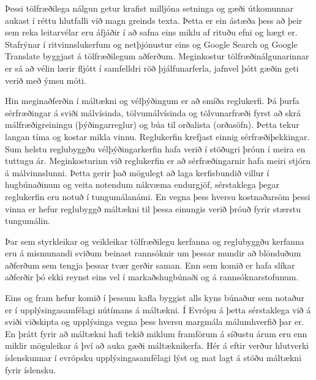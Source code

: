 \begin{multicols}{2}
Þessi tölfræðilega nálgun getur krafist milljóna setninga og gæði útkomunnar aukast í réttu hlutfalli við magn greinds texta. Þetta er ein ástæða þess að þeir sem reka leitarvélar eru áfjáðir í að safna eins miklu af rituðu efni og hægt er. Stafrýnar í ritvinnslukerfum og netþjónustur eins og Google Search og Google Translate byggjast á tölfræðilegum aðferðum. Meginkostur tölfræðinálgunarinnar er sá að vélin lærir fljótt í samfelldri röð þjálfunarferla, jafnvel þótt gæðin geti verið með ýmsu móti.

Hin meginaðferðin í máltækni og vélþýðingum er að smíða reglukerfi. Þá þurfa sérfræðingar á sviði málvísinda, tölvumálvísinda og tölvunarfræði fyrst að skrá málfræðigreiningu (þýðingarreglur) og búa til orðalista (orðasöfn). Þetta tekur langan tíma og kostar mikla vinnu. Reglukerfin krefjast einnig sérfræðiþekkingar. Sum helstu reglubyggðu vélþýðingarkerfin hafa verið í stöðugri þróun í meira en tuttugu ár. Meginkosturinn við reglukerfin er að sérfræðingarnir hafa meiri stjórn á málvinnslunni. Þetta gerir það mögulegt að laga kerfisbundið villur í hugbúnaðinum og veita notendum nákvæma endurgjöf, sérstaklega þegar reglukerfin eru notuð í tungumálanámi. En vegna þess hversu kostnaðarsöm þessi vinna er hefur reglubyggð máltækni til þessa einungis verið þróuð fyrir stærstu tungumálin.

Þar sem styrkleikar og veikleikar tölfræðilegu kerfanna og reglubyggðu kerfanna eru á mismunandi sviðum beinast rannsóknir um þessar mundir að blönduðum aðferðum sem tengja þessar tvær gerðir saman. Enn sem komið er hafa slíkar aðferðir þó ekki reynst eins vel í markaðshugbúnaði og á rannsóknarstofunum.

Eins og fram hefur komið í þessum kafla byggist alls kyns búnaður sem notaður er í upplýsingasamfélagi nútímans á máltækni. Í Evrópu á þetta sérstaklega við á sviði viðskipta og upplýsinga vegna þess hversu margmála málumhverfið þar er. En þrátt fyrir að máltækni hafi tekið miklum framförum á síðustu árum eru enn miklir möguleikar á því að auka gæði máltæknikerfa. Hér á eftir verður hlutverki íslenskunnar í evrópsku upplýsingasamfélagi lýst og mat lagt á stöðu máltækni fyrir íslensku.
\end{multicols}

\clearpage



